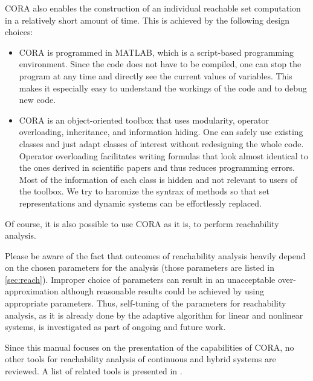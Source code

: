 CORA also enables the construction of an individual reachable set computation in a relatively short amount of time. This is achieved by the following design choices:
\begin{itemize}
 \item CORA is programmed in MATLAB, which is a script-based programming environment. Since the code does not have to be compiled, one can stop the program at any time and directly see the current values of variables. This makes it especially easy to understand the workings of the code and to debug new code. 
 \item CORA is an object-oriented toolbox that uses modularity, operator overloading, inheritance, and information hiding. One can safely use existing classes and just adapt classes of interest without redesigning the whole code. Operator overloading facilitates writing formulas that look almost identical to the ones derived in scientific papers and thus reduces programming errors. Most of the information of each class is hidden and not relevant to users of the toolbox. We try to haromize the syntrax of methods so that set representations and dynamic systems can be effortlessly replaced.
\end{itemize}
Of course, it is also possible to use CORA as it is, to perform reachability analysis. 
\begin{framed}
 Please be aware of the fact that outcomes of reachability analysis heavily depend on the chosen parameters for the analysis (those parameters are listed in \cref{sec:reach}). Improper choice of parameters can result in an unacceptable over-approximation although reasonable results could be achieved by using appropriate parameters. Thus, self-tuning of the parameters for reachability analysis, as it is already done by the adaptive algorithm for linear and nonlinear systems, is investigated as part of ongoing and future work.
\end{framed}
Since this manual focuses on the presentation of the capabilities of CORA, no other tools for reachability analysis of continuous and hybrid systems are reviewed. A list of related tools is presented in \cite{Althoff2015a, Althoff2016a, Althoff2018b}.